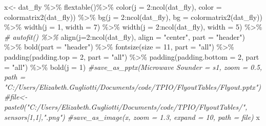 \documentclass[
]{article}
\newenvironment{Shaded}{\begin{snugshade}}{\end{snugshade}}
\newcommand{\AttributeTok}[1]{\textcolor[rgb]{0.77,0.63,0.00}{#1}}
\newcommand{\CommentTok}[1]{\textcolor[rgb]{0.56,0.35,0.01}{\textit{#1}}}
\newcommand{\DecValTok}[1]{\textcolor[rgb]{0.00,0.00,0.81}{#1}}
\newcommand{\FunctionTok}[1]{\textcolor[rgb]{0.00,0.00,0.00}{#1}}
\newcommand{\NormalTok}[1]{#1}
\newcommand{\OtherTok}[1]{\textcolor[rgb]{0.56,0.35,0.01}{#1}}
\newcommand{\SpecialCharTok}[1]{\textcolor[rgb]{0.00,0.00,0.00}{#1}}
\newcommand{\StringTok}[1]{\textcolor[rgb]{0.31,0.60,0.02}{#1}}
\begin{document}
\begin{Shaded}
\begin{Highlighting}[]
\NormalTok{x}\OtherTok{\textless{}{-}}\NormalTok{ dat\_fly }\SpecialCharTok{\%\textgreater{}\%}
    \FunctionTok{flextable}\NormalTok{()}\SpecialCharTok{\%\textgreater{}\%}
    \FunctionTok{color}\NormalTok{(}\AttributeTok{j =} \DecValTok{2}\SpecialCharTok{:}\FunctionTok{ncol}\NormalTok{(dat\_fly), }\AttributeTok{color =} \FunctionTok{colormatrix2}\NormalTok{(dat\_fly)) }\SpecialCharTok{\%\textgreater{}\%}
    \FunctionTok{bg}\NormalTok{(}\AttributeTok{j =} \DecValTok{2}\SpecialCharTok{:}\FunctionTok{ncol}\NormalTok{(dat\_fly), }\AttributeTok{bg =} \FunctionTok{colormatrix2}\NormalTok{(dat\_fly)) }\SpecialCharTok{\%\textgreater{}\%}
    \FunctionTok{width}\NormalTok{(}\AttributeTok{j =} \DecValTok{1}\NormalTok{, }\AttributeTok{width =} \DecValTok{7}\NormalTok{) }\SpecialCharTok{\%\textgreater{}\%}
    \FunctionTok{width}\NormalTok{(}\AttributeTok{j =} \DecValTok{2}\SpecialCharTok{:}\FunctionTok{ncol}\NormalTok{(dat\_fly), }\AttributeTok{width =} \DecValTok{5}\NormalTok{) }\SpecialCharTok{\%\textgreater{}\%}
\CommentTok{\#    autofit() \%\textgreater{}\%}
    \FunctionTok{align}\NormalTok{(}\AttributeTok{j=}\DecValTok{2}\SpecialCharTok{:}\FunctionTok{ncol}\NormalTok{(dat\_fly), }\AttributeTok{align =} \StringTok{"center"}\NormalTok{, }\AttributeTok{part =} \StringTok{"header"}\NormalTok{) }\SpecialCharTok{\%\textgreater{}\%}
    \FunctionTok{bold}\NormalTok{(}\AttributeTok{part =} \StringTok{"header"}\NormalTok{) }\SpecialCharTok{\%\textgreater{}\%}
    \FunctionTok{fontsize}\NormalTok{(}\AttributeTok{size =} \DecValTok{11}\NormalTok{, }\AttributeTok{part =} \StringTok{"all"}\NormalTok{) }\SpecialCharTok{\%\textgreater{}\%}
    \FunctionTok{padding}\NormalTok{(}\AttributeTok{padding.top =} \DecValTok{2}\NormalTok{, }\AttributeTok{part =} \StringTok{"all"}\NormalTok{) }\SpecialCharTok{\%\textgreater{}\%}
    \FunctionTok{padding}\NormalTok{(}\AttributeTok{padding.bottom =} \DecValTok{2}\NormalTok{, }\AttributeTok{part =} \StringTok{"all"}\NormalTok{) }\SpecialCharTok{\%\textgreater{}\%}
    \FunctionTok{bold}\NormalTok{(}\AttributeTok{j =} \DecValTok{1}\NormalTok{)}
\CommentTok{\#save\_as\_pptx(\textasciigrave{}Microwave Sounder\textasciigrave{} = s1, zoom = 0.5, path = "C:/Users/Elizabeth.Gugliotti/Documents/code/TPIO/FlyoutTables/Flyout.pptx")}
\CommentTok{\#file\textless{}{-}paste0("C:/Users/Elizabeth.Gugliotti/Documents/code/TPIO/FlyoutTables/", sensors[1,1],".png")}
\CommentTok{\#save\_as\_image(x, zoom = 1.3, expand = 10, path = file)}
\NormalTok{x}
\end{Highlighting}
\end{Shaded}
\end{document}
